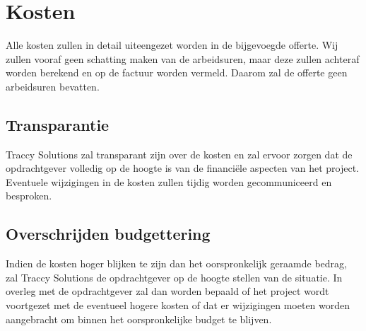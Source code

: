 \section{Kosten}
Alle kosten zullen in detail uiteengezet worden in de bijgevoegde offerte. Wij zullen vooraf geen schatting maken van de arbeidsuren, maar deze zullen achteraf worden berekend en op de factuur worden vermeld. Daarom zal de offerte geen arbeidsuren bevatten.


\subsection{Transparantie}
Traccy Solutions zal transparant zijn over de kosten en zal ervoor zorgen dat de opdrachtgever volledig op de hoogte is van de financiële aspecten van het project. Eventuele wijzigingen in de kosten zullen tijdig worden gecommuniceerd en besproken.



\subsection{Overschrijden budgettering}
Indien de kosten hoger blijken te zijn dan het oorspronkelijk geraamde bedrag, zal Traccy Solutions de opdrachtgever op de hoogte stellen van de situatie. In overleg met de opdrachtgever zal dan worden bepaald of het project wordt voortgezet met de eventueel hogere kosten of dat er wijzigingen moeten worden aangebracht om binnen het oorspronkelijke budget te blijven.